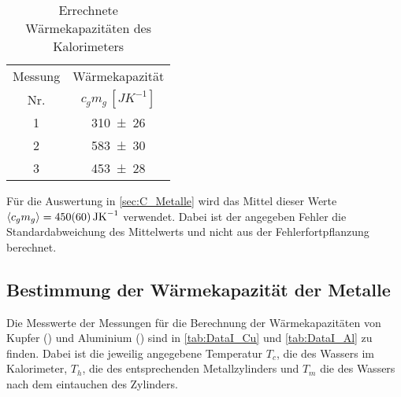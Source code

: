 	\begin{table}[!h]
		\centering
		\begin{tabular}{|c|c|}	
		\hline
			Messung   & Wärmekapazität\\
			Nr.		  & $c_{g}m_{g}\,[\si{JK^{-1}}]$\\ \hline \hline
			1& \num{310(26)}    \\    
			2& \num{583(30)}	  \\
			3& \num{453(28)}   \\
			\hline
		\end{tabular}
		\caption{Errechnete Wärmekapazitäten des Kalorimeters \label{tab:CM_Kalorimeter}}
	\end{table}
	
	Für die Auswertung in \autoref{sec:C_Metalle} wird das Mittel
	dieser Werte $\mean{c_{g}m_{g}} = \SI{450(60)}{JK^{-1}}$ verwendet.
	Dabei ist der angegeben Fehler die Standardabweichung des Mittelwerts
	und nicht aus der Fehlerfortpflanzung berechnet.
	
	 
\subsection{Bestimmung der Wärmekapazität der Metalle}\label{sec:C_Metalle}
	
	Die Messwerte der Messungen für die Berechnung der Wärmekapazitäten 
	von Kupfer () und Aluminium () sind in \autoref{tab:DataI_Cu}
	und \ref{tab:DataI_Al} zu finden. Dabei ist die jeweilig angegebene Temperatur
	$T_{c}$, die des Wassers im Kalorimeter, $T_{h}$, die des
	entsprechenden Metallzylinders und $T_{m}$ die des Wassers nach dem
	eintauchen des Zylinders.    
	
